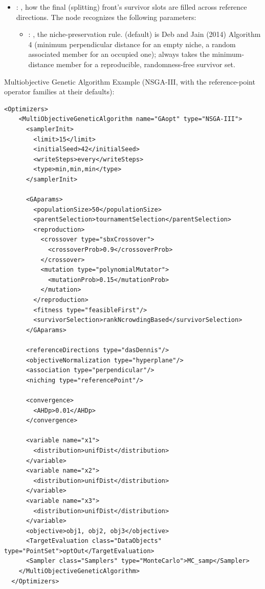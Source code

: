 \begin{itemize}
    \item {}: ,
      how the final (splitting) front's survivor slots are filled across reference
      directions.
      The  node recognizes the following parameters:
        \begin{itemize}
          \item {}: ,
            the niche-preservation rule.  (default) is Deb and Jain
            (2014) Algorithm 4 (minimum perpendicular distance for an empty niche, a random
            associated member for an occupied one); 
            always takes the minimum-distance member for a reproducible, randomness-free
            survivor set.
      \end{itemize}

  \end{itemize}

\hspace{24pt}
Multiobjective Genetic Algorithm Example (NSGA-III, with the reference-point operator families at
their defaults):
\begin{lstlisting}[style=XML]
  <Optimizers>
    <MultiObjectiveGeneticAlgorithm name="GAopt" type="NSGA-III">
      <samplerInit>
        <limit>15</limit>
        <initialSeed>42</initialSeed>
        <writeSteps>every</writeSteps>
        <type>min,min,min</type>
      </samplerInit>

      <GAparams>
        <populationSize>50</populationSize>
        <parentSelection>tournamentSelection</parentSelection>
        <reproduction>
          <crossover type="sbxCrossover">
            <crossoverProb>0.9</crossoverProb>
          </crossover>
          <mutation type="polynomialMutator">
            <mutationProb>0.15</mutationProb>
          </mutation>
        </reproduction>
        <fitness type="feasibleFirst"/>
        <survivorSelection>rankNcrowdingBased</survivorSelection>
      </GAparams>

      <referenceDirections type="dasDennis"/>
      <objectiveNormalization type="hyperplane"/>
      <association type="perpendicular"/>
      <niching type="referencePoint"/>

      <convergence>
        <AHDp>0.01</AHDp>
      </convergence>

      <variable name="x1">
        <distribution>unifDist</distribution>
      </variable>
      <variable name="x2">
        <distribution>unifDist</distribution>
      </variable>
      <variable name="x3">
        <distribution>unifDist</distribution>
      </variable>
      <objective>obj1, obj2, obj3</objective>
      <TargetEvaluation class="DataObjects" type="PointSet">optOut</TargetEvaluation>
      <Sampler class="Samplers" type="MonteCarlo">MC_samp</Sampler>
    </MultiObjectiveGeneticAlgorithm>
  </Optimizers>
\end{lstlisting}



